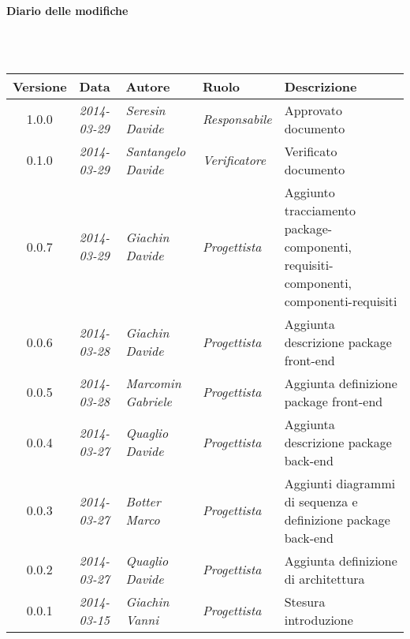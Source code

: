 \noindent\begin{Large}\textbf{Diario delle modifiche}\end{Large}\\
\\
\begin{small}
\begin{tabular}{|c|p{1.8cm}|p{2.8cm}|p{2.8cm}|p{3.5cm}|}
\hline
Versione & Data & Autore & Ruolo & Descrizione \\
\hline
\hline
1.0.0 & \textit{2014-03-29} & 
\textit{Seresin Davide} &
\textit{Responsabile} &Approvato documento\\
\hline
\hline
0.1.0 & \textit{2014-03-29} & 
\textit{Santangelo Davide} &
\textit{Verificatore} &Verificato documento\\
\hline
\hline
0.0.7 & \textit{2014-03-29} & 
\textit{Giachin Davide} &
\textit{Progettista} & Aggiunto tracciamento package-componenti, requisiti-componenti, componenti-requisiti\\
\hline
\hline
0.0.6 & \textit{2014-03-28} & 
\textit{Giachin Davide} &
\textit{Progettista} & Aggiunta descrizione package front-end\\
\hline
\hline
0.0.5 & \textit{2014-03-28} & 
\textit{Marcomin Gabriele} &
\textit{Progettista} & Aggiunta definizione package front-end\\
\hline
\hline
0.0.4 & \textit{2014-03-27} & 
\textit{Quaglio Davide} &
\textit{Progettista} & Aggiunta descrizione package back-end\\
\hline
\hline
0.0.3 & \textit{2014-03-27} & 
\textit{Botter Marco} &
\textit{Progettista} & Aggiunti diagrammi di sequenza e definizione package back-end\\
\hline
\hline
0.0.2 & \textit{2014-03-27} & 
\textit{Quaglio Davide} &
\textit{Progettista} & Aggiunta definizione di architettura \\
\hline
\hline
0.0.1 & \textit{2014-03-15} & 
\textit{Giachin Vanni} &
\textit{Progettista} & Stesura introduzione\\
\hline
\end{tabular}\\
\end{small}